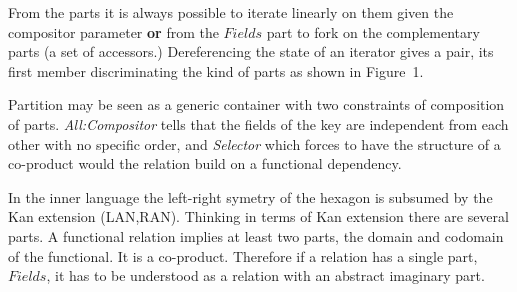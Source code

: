 \hfill
\noindent
From the parts it is always possible to iterate linearly on them given the compositor parameter {\bf or} from the $Fields$ part to fork on the complementary parts (a set of accessors.) Dereferencing the state of an iterator gives a pair, its first member discriminating the kind of parts as shown in Figure~1.

Partition may be seen as a generic container with two constraints of composition of parts. {\it All:Compositor} tells that the fields of the key are independent from each other with no specific order, and {\it Selector} which forces to have the structure of a co-product would the relation build on a functional dependency.

In the inner language the left-right symetry of the hexagon is subsumed by the Kan extension (LAN,RAN). Thinking in terms of Kan extension there are several parts. A functional relation implies at least two parts, the domain and codomain of the functional. It is a co-product. Therefore if a relation has a single part, $Fields$, it has to be understood as a relation with an abstract imaginary part.

